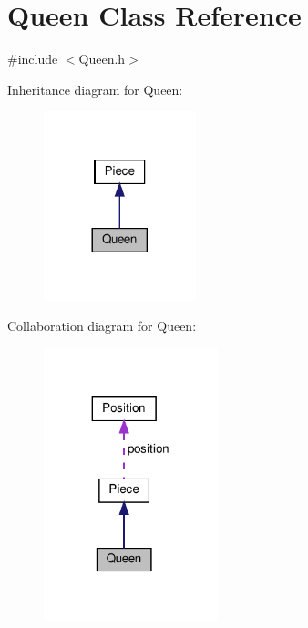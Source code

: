\hypertarget{class_queen}{}\section{Queen Class Reference}
\label{class_queen}


{\ttfamily \#include $<$Queen.\+h$>$}



Inheritance diagram for Queen\+:\nopagebreak
\begin{figure}[H]
\begin{center}
\leavevmode
\includegraphics[width=125pt]{class_queen__inherit__graph}
\end{center}
\end{figure}


Collaboration diagram for Queen\+:\nopagebreak
\begin{figure}[H]
\begin{center}
\leavevmode
\includegraphics[width=143pt]{class_queen__coll__graph}
\end{center}
\end{figure}
